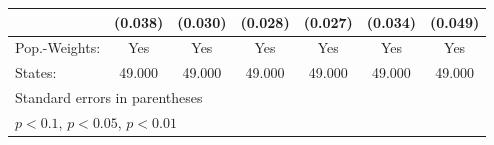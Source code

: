 {\begin{tabular}{l*{6}{c}}
            &     (0.038)         &     (0.030)         &     (0.028)         &     (0.027)         &     (0.034)         &     (0.049)         \\
\hline
Pop.-Weights:&         Yes         &         Yes         &         Yes         &         Yes         &         Yes         &         Yes         \\
States:     &      49.000         &      49.000         &      49.000         &      49.000         &      49.000         &      49.000         \\
\hline\hline
\multicolumn{7}{l}{\footnotesize Standard errors in parentheses}\\
\multicolumn{7}{l}{\footnotesize \sym{*} \(p<0.1\), \sym{**} \(p<0.05\), \sym{***} \(p<0.01\)}\\
\end{tabular}
}
